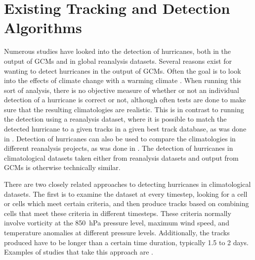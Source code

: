 \documentclass[pdftex,12pt,a4paper]{report}
\begin{document}
\section{Existing Tracking and Detection Algorithms}


Numerous studies have looked into the detection of hurricanes, both in the output of GCMs and in
global reanalysis datasets. Several reasons exist for wanting to detect hurricanes in the output of
GCMs. Often the goal is to look into the effects of climate change with a warming climate
\parencite{bengtsson1996will, sugi2002influence}. When running this sort of
analysis, there is no objective measure of whether or not an individual detection of a hurricane is
correct or not, although often tests are done to make sure that the resulting climatologies are
realistic. This is in contrast to running the detection using a
reanalysis dataset, where it is possible to match the detected hurricane to a given
tracks in a given best track database, as was done in \textcite{walsh1997objective}. Detection of
hurricanes can also be used to compare the climatologies in different reanalysis projects, as was
done in \textcite{trigo2006climatology}. The detection of hurricanes in climatological datasets
taken either from reanalysis datasets and output from GCMs is otherwise technically similar.

There are two closely related approaches to detecting hurricanes in climatological datasets. The
first is to examine the dataset at every timestep, looking for a cell or cells which meet certain
criteria, and then produce tracks based on combining cells that meet these criteria in different
timesteps. These criteria normally involve vorticity at the \SI{850}{hPa} pressure level,
maximum wind speed, and temperature anomalies at different pressure levels. Additionally, the tracks
produced have to be longer than a certain time duration, typically 1.5 to 2 days. Examples of
studies that take this approach are \textcite{bengtsson1995hurricane, walsh1997objective}.
\end{document}
